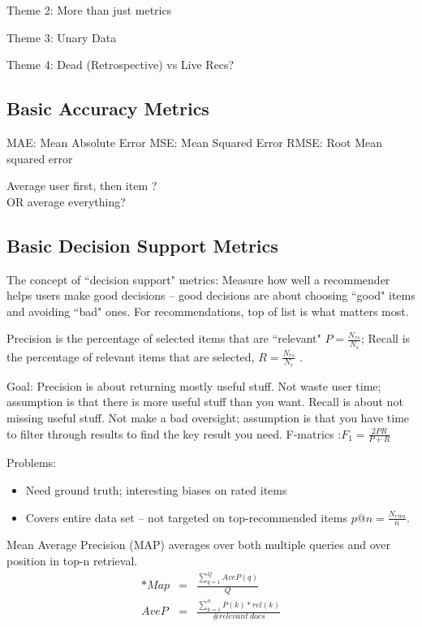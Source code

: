 \documentclass[fleqn,twoside]{article}
\begin{document}
Theme 2: More than just metrics

Theme 3: Unary Data

Theme 4:  Dead (Retrospective) vs Live Recs?

\subsection{Basic Accuracy Metrics}
MAE: Mean Absolute Error
MSE: Mean Squared Error
RMSE:  Root Mean squared error

Average user first, then item ? \\
OR average everything?

\subsection{Basic Decision Support Metrics}

   The concept of ``decision support" metrics:  Measure how well a recommender helps users make good decisions -- good decisions are about choosing ``good" items and avoiding ``bad" ones. 
   For recommendations, top of list is what matters most.
   
   Precision is the percentage of selected items that are ``relevant"  $P=\frac{N_{rs}}{N_s}$;
   Recall is the percentage of relevant items that are selected, $R=\frac{N_{rs}}{N_r}$ . 
   
 Goal:  Precision is about returning mostly useful stuff. Not waste user time; assumption is that there is more useful stuff than you want.
 	    Recall is about not missing useful stuff.  Not make a bad oversight; assumption is that you have time to filter through results to find the key result you need.
	    F-matrics :$F_1 =\frac{2 PR}{P+R}$
   
   Problems:
   \begin{itemize}
   \item Need ground truth;  interesting biases on rated items
   \item  Covers entire data set -- not targeted on top-recommended items
   $p @ n =  \frac{ N_{r@n} } {n}$.  
   \end{itemize}
   
   Mean Average Precision (MAP) averages over both multiple queries and over position in top-n retrieval. 
   \begin{eqnarray}{*}
   Map   &=& \frac{ \sum_{q=1}^{Q} Ave P(q)} {Q}  \\
   Ave P &=& \frac{\sum_{k=1}^{n} P(k) * rel(k)}{\# relevant~docs}
   \end{eqnarray}
   
\end{document}
